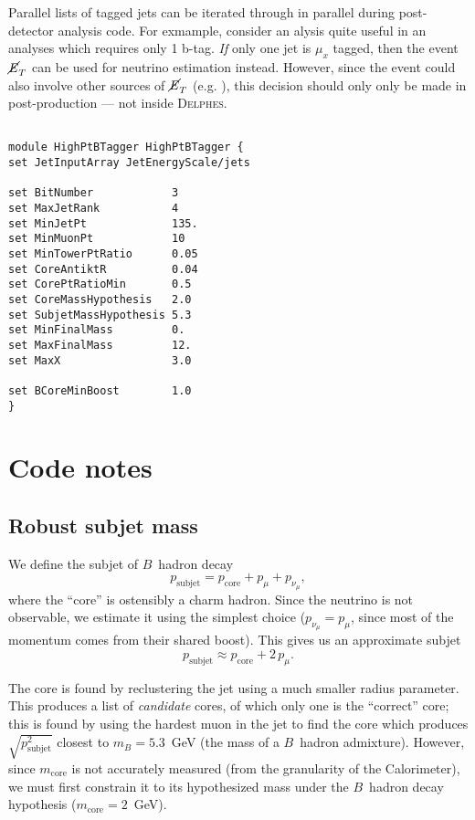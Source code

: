 \documentclass{article}
\newcommand{\muX}{$\mu_{x}^{}$}
\newcommand{\delphes}{\textsc{Delphes}}
\newcommand{\MET}{\cancel{E}_{T}^{}}
\newcommand{\pSubjet}[1][] {p_{\mathrm{subjet}}^{#1}}
\newcommand{\pCore}[1][]   {p_{\mathrm{core}}^{#1}}
\newcommand{\pMu}[1][]     {p_{\mu}^{#1}}
\newcommand{\pNu}[1][]     {p_{\nu_{\mu}}^{#1}}
\newcommand{\mB}             {m_{B}^{}}
\newcommand{\mCore}[1][]     {m_{\mathrm{core}}^{#1}}
\begin{document}
Parallel lists of tagged jets can be iterated through in parallel during
post-detector analysis code. For exmample, consider an alysis 
quite useful in an analyses which requires only 1 b-tag. \emph{If} only one jet
is {\muX} tagged, then the event $\MET$ can be used
for neutrino estimation instead. However, since the event could also involve
other sources of $\MET$ (e.g. ), this decision
should only only be made in post-production --- not inside {\delphes}.

\begin{lstlisting}

module HighPtBTagger HighPtBTagger {
set JetInputArray JetEnergyScale/jets

set BitNumber            3
set MaxJetRank           4
set MinJetPt             135.
set MinMuonPt            10
set MinTowerPtRatio      0.05
set CoreAntiktR          0.04
set CorePtRatioMin       0.5
set CoreMassHypothesis   2.0
set SubjetMassHypothesis 5.3
set MinFinalMass         0.
set MaxFinalMass         12.
set MaxX                 3.0

set BCoreMinBoost        1.0
}
\end{lstlisting}

\section{Code notes}
\subsection{Robust subjet mass}
We define the subjet of $B$~hadron decay
%
\begin{equation}
\pSubjet=\pCore+\pMu+\pNu,
\end{equation}
%
where the ``core'' is ostensibly a charm hadron. 
Since the neutrino is not observable, we estimate it using the 
simplest choice ($\pNu=\pMu$, since most of the momentum comes from
their shared boost). This gives us an approximate subjet
%
\begin{equation}
\pSubjet\approx\pCore+2\,\pMu.
\end{equation}
%

The core is found by reclustering the jet using a much smaller radius 
parameter. This produces a list of \emph{candidate} cores, of which only
one is the ``correct'' core; this is found by using the hardest muon in 
the jet to find the core which produces $\sqrt{\pSubjet[2]}$ closest to 
$\mB=5.3$~GeV (the mass of a $B$~hadron admixture). 
However, since $\mCore$ is not accurately measured 
(from the granularity of the Calorimeter), we must first constrain it to its 
hypothesized mass under the $B$~hadron decay hypothesis ($\mCore=2$~GeV).
\end{document}
